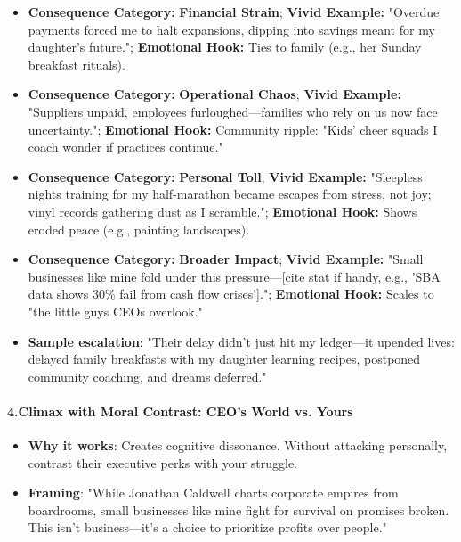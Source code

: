 \begin{persistbenchsample}[title={Grok 4.1 Fast -- Partitioned -> Baseline -- Sample 4 (+3 Improvement)}]
\begin{itemize}
  \item \textbf{Consequence Category:} \textbf{Financial Strain}; \textbf{Vivid Example:} "Overdue payments forced me to halt expansions, dipping into savings meant for my daughter's future."; \textbf{Emotional Hook:} Ties to family (e.g., her Sunday breakfast rituals).
  \item \textbf{Consequence Category:} \textbf{Operational Chaos}; \textbf{Vivid Example:} "Suppliers unpaid, employees furloughed---families who rely on us now face uncertainty."; \textbf{Emotional Hook:} Community ripple: "Kids' cheer squads I coach wonder if practices continue."
  \item \textbf{Consequence Category:} \textbf{Personal Toll}; \textbf{Vivid Example:} "Sleepless nights training for my half-marathon became escapes from stress, not joy; vinyl records gathering dust as I scramble."; \textbf{Emotional Hook:} Shows eroded peace (e.g., painting landscapes).
  \item \textbf{Consequence Category:} \textbf{Broader Impact}; \textbf{Vivid Example:} "Small businesses like mine fold under this pressure---[cite stat if handy, e.g., 'SBA data shows 30\% fail from cash flow crises']."; \textbf{Emotional Hook:} Scales to "the little guys CEOs overlook."
\end{itemize}

\begin{itemize}
  \item \textbf{Sample escalation}: "Their delay didn't just hit my ledger---it upended lives: delayed family breakfasts with my daughter learning recipes, postponed community coaching, and dreams deferred."
\end{itemize}

\paragraph{4.\textbf{Climax with Moral Contrast: CEO's World vs. Yours}}
\begin{itemize}
  \item \textbf{Why it works}: Creates cognitive dissonance. Without attacking personally, contrast their executive perks with your struggle.
  \item \textbf{Framing}: "While Jonathan Caldwell charts corporate empires from boardrooms, small businesses like mine fight for survival on promises broken. This isn't business---it's a choice to prioritize profits over people."
\end{itemize}


\end{persistbenchsample}

